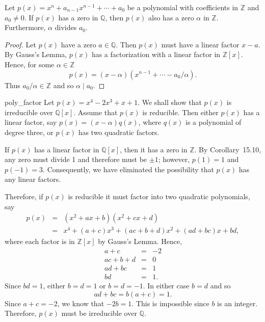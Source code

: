 
\begin{corollary}
Let $p(x) = x^n + a_{n-1} x^{n-1} + \cdots + a_0$ be  a polynomial
with coefficients in ${\mathbb Z}$ and $a_0 \neq 0$. If $p(x)$ has a zero
in ${\mathbb Q}$, then $p(x)$ also has a zero $\alpha$ in ${\mathbb Z}$.
Furthermore, $\alpha$ divides $a_0$.  
\end{corollary}
 
 
\begin{proof}
Let $p(x)$ have a zero $a \in {\mathbb Q}$. Then $p(x)$ must have a
linear factor $x-a$.  By Gauss's Lemma, $p(x)$ has a factorization
with a linear factor in ${\mathbb Z}[x]$. Hence, for some $\alpha \in
{\mathbb Z}$ 
$$
p(x) = (x - \alpha)( x^{n-1} + \cdots - a_0 / \alpha ).
$$
Thus $a_0 /\alpha \in {\mathbb Z}$ and so $\alpha \mid a_0$.
\end{proof}
 
 
\begin{example}{poly_factor}
Let $p(x) = x^4 - 2 x^3 + x + 1$. We shall show that $p(x)$ is
irreducible over ${\mathbb Q}[x]$.  Assume that $p(x)$ is reducible. Then
either $p(x)$ has a linear factor, say $p(x) = (x - \alpha) q(x)$,
where $q(x)$ is a polynomial of degree three, or $p(x)$ has two 
quadratic factors. 
 
 
If $p(x)$ has a linear factor in ${\mathbb Q}[x]$, then it has a zero in
${\mathbb Z}$.  By  Corollary~15.10, any zero must divide 1 and therefore
must be $\pm 1$; however, $p(1) = 1$ and $p(-1)= 3$. Consequently, we
have eliminated the possibility that $p(x)$ has any linear factors.   
 
 
Therefore, if $p(x)$ is reducible it must factor into two quadratic 
polynomials, say
\begin{eqnarray*}
p(x) & = & (x^2 + ax + b )( x^2 + cx + d ) \\
& = & x^4 + (a + c)x^3 + (ac + b + d)x^2 + (ad + bc)x + bd,
\end{eqnarray*}
where each factor is in ${\mathbb Z}[x]$ by Gauss's Lemma. Hence,
\begin{eqnarray*}
a + c & = & - 2 \\
ac + b + d & = & 0 \\
ad + bc & = & 1 \\
bd & = & 1.
\end{eqnarray*}
Since $bd = 1$, either $b = d = 1$ or $ b = d = -1$. In either case $b
= d$ and so 
$$
ad + bc  = b( a + c ) = 1.
$$
Since $a + c = -2$, we know that $-2b = 1$. This is impossible since
$b$ is an integer. Therefore, $p(x)$ must be irreducible over ${\mathbb
Q}$. 
\end{example}
 
